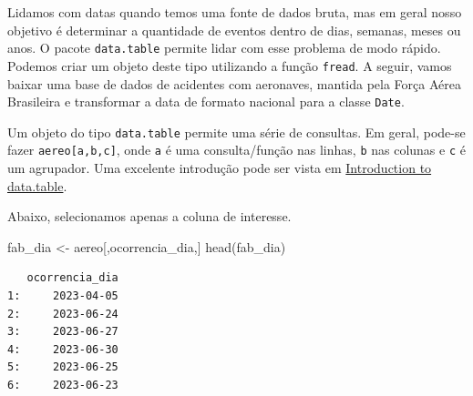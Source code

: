 \documentclass[
  letterpaper,
  DIV=11,
  numbers=noendperiod]{scrreprt}
\newenvironment{Shaded}{\begin{snugshade}}{\end{snugshade}}
\newcommand{\AttributeTok}[1]{\textcolor[rgb]{0.40,0.45,0.13}{#1}}
\newcommand{\FunctionTok}[1]{\textcolor[rgb]{0.28,0.35,0.67}{#1}}
\newcommand{\NormalTok}[1]{\textcolor[rgb]{0.00,0.23,0.31}{#1}}
\newcommand{\OtherTok}[1]{\textcolor[rgb]{0.00,0.23,0.31}{#1}}
\newcommand{\SpecialCharTok}[1]{\textcolor[rgb]{0.37,0.37,0.37}{#1}}
\newcommand{\StringTok}[1]{\textcolor[rgb]{0.13,0.47,0.30}{#1}}
\begin{document}
Lidamos com datas quando temos uma fonte de dados bruta, mas em geral
nosso objetivo é determinar a quantidade de eventos dentro de dias,
semanas, meses ou anos. O pacote \texttt{data.table} permite lidar com
esse problema de modo rápido. Podemos criar um objeto deste tipo
utilizando a função \texttt{fread}. A seguir, vamos baixar uma base de
dados de acidentes com aeronaves, mantida pela Força Aérea Brasileira e
transformar a data de formato nacional para a classe \texttt{Date}.

\begin{Shaded}
\end{Shaded}

Um objeto do tipo \texttt{data.table} permite uma série de consultas. Em
geral, pode-se fazer \texttt{aereo{[}a,b,c{]}}, onde \texttt{a} é uma
consulta/função nas linhas, \texttt{b} nas colunas e \texttt{c} é um
agrupador. Uma excelente introdução pode ser vista em
\href{https://cran.r-project.org/web/packages/data.table/vignettes/datatable-intro.html}{Introduction
to data.table}.

Abaixo, selecionamos apenas a coluna de interesse.

\begin{Shaded}
\begin{Highlighting}[]
\NormalTok{fab\_dia }\OtherTok{\textless{}{-}}\NormalTok{ aereo[,}\StringTok{\textquotesingle{}ocorrencia\_dia\textquotesingle{}}\NormalTok{,]}
\FunctionTok{head}\NormalTok{(fab\_dia)}
\end{Highlighting}
\end{Shaded}

\begin{verbatim}
   ocorrencia_dia
1:     2023-04-05
2:     2023-06-24
3:     2023-06-27
4:     2023-06-30
5:     2023-06-25
6:     2023-06-23
\end{verbatim}
\end{document}
